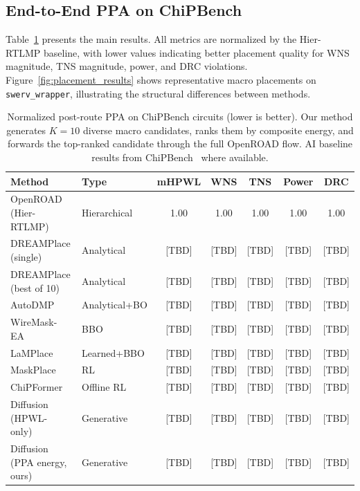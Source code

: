 \documentclass[sigconf,anonymous,review,9pt]{acmart}
\begin{document}
\subsection{End-to-End PPA on ChiPBench}

Table~\ref{tab:main} presents the main results. All metrics are
normalized by the Hier-RTLMP baseline, with lower values indicating
better placement quality for WNS magnitude, TNS magnitude, power, and
DRC violations. Figure~\ref{fig:placement_results} shows representative
macro placements on \texttt{swerv\_wrapper}, illustrating the structural
differences between methods.

\begin{table}[t]
\centering
\caption{Normalized post-route PPA on ChiPBench circuits (lower is
better). Our method generates $K{=}10$ diverse macro candidates, ranks
them by composite energy, and forwards the top-ranked candidate through
the full OpenROAD flow. AI baseline results from
ChiPBench~\cite{chipbench2025} where available.}
\label{tab:main}
\small
\begin{tabular}{llccccc}
\toprule
Method & Type & mHPWL & WNS & TNS & Power & DRC \\
\midrule
OpenROAD (Hier-RTLMP) & Hierarchical & 1.00 & 1.00 & 1.00 & 1.00 & 1.00 \\
DREAMPlace (single) & Analytical & [TBD] & [TBD] & [TBD] & [TBD] & [TBD] \\
DREAMPlace (best of 10) & Analytical & [TBD] & [TBD] & [TBD] & [TBD] & [TBD] \\
AutoDMP~\cite{autodmp2023} & Analytical+BO & [TBD] & [TBD] & [TBD] & [TBD] & [TBD] \\
\midrule
WireMask-EA~\cite{shi2023wire} & BBO & [TBD] & [TBD] & [TBD] & [TBD] & [TBD] \\
LaMPlace~\cite{lamplace2025} & Learned+BBO & [TBD] & [TBD] & [TBD] & [TBD] & [TBD] \\
MaskPlace~\cite{lai2022maskplace} & RL & [TBD] & [TBD] & [TBD] & [TBD] & [TBD] \\
ChiPFormer~\cite{lai2023chipformer} & Offline RL & [TBD] & [TBD] & [TBD] & [TBD] & [TBD] \\
\midrule
Diffusion (HPWL-only)~\cite{chen2026dac} & Generative & [TBD] & [TBD] & [TBD] & [TBD] & [TBD] \\
Diffusion (PPA energy, ours) & Generative & [TBD] & [TBD] & [TBD] & [TBD] & [TBD] \\
\bottomrule
\end{tabular}
\end{table}
\end{document}

